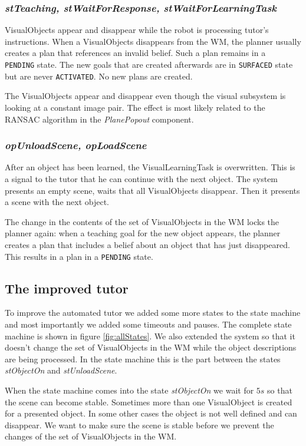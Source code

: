 \documentclass{article}
\begin{document}
\subsubsection*{\em stTeaching, stWaitForResponse, stWaitForLearningTask}

VisualObjects appear and disappear while the robot is processing tutor's
instructions. When a VisualObjects disappears from the WM, the planner usually
creates a plan that references an invalid belief. Such a plan remains in a {\tt
PENDING} state. The new goals that are created afterwards are in {\tt SURFACED}
state but are never {\tt ACTIVATED}. No new plans are created.

The VisualObjects appear and disappear even though the visual subsystem is
looking at a constant image pair. The effect is most likely related to the
RANSAC algorithm in the {\em PlanePopout} component.

\subsubsection*{\em opUnloadScene, opLoadScene}

After an object has been learned, the VisualLearningTask is overwritten. This
is a signal to the tutor that he can continue with the next object. The system
presents an empty scene, waits that all VisualObjects disappear. Then it
presents a scene with the next object.

The change in the contents of the set of VisualObjects in the WM locks the
planner again: when a teaching goal for the new object appears, the planner
creates a plan that includes a belief about an object that has just
disappeared. This results in a plan in a {\tt PENDING} state.

\subsection{The improved tutor}

To improve the automated tutor we added some more states to the state machine
and most importantly we added some timeouts and pauses. The complete state
machine is shown in figure \ref{fig:allStates}. We also extended the system so
that it doesn't change the set of VisualObjects in the WM while the object
descriptions are being processed. In the state machine this is the part between
the states {\em stObjectOn} and {\em stUnloadScene}.

When the state machine comes into the state {\em stObjectOn} we wait for $5s$
so that the scene can become stable. Sometimes more than one VisualObject is
created for a presented object. In some other cases the object is not well
defined and can disappear. We want to make sure the scene is stable before we
prevent the changes of the set of VisualObjects in the WM.
\end{document}
